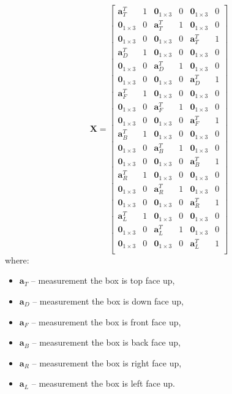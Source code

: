 \begin{equation}
	\bm{X} = 
	\begin{bmatrix}
		\bm{a}^T_T & 1 & \bm{0}_{1 \times 3} & 0 & \bm{0}_{1 \times 3} & 0\\
		\bm{0}_{1 \times 3} & 0 & \bm{a}^T_T & 1 & \bm{0}_{1 \times 3} & 0\\
		\bm{0}_{1 \times 3} & 0 & \bm{0}_{1 \times 3} & 0 & \bm{a}^T_T & 1\\
		
		\bm{a}^T_D & 1 & \bm{0}_{1 \times 3} & 0 & \bm{0}_{1 \times 3} & 0\\
		\bm{0}_{1 \times 3} & 0 & \bm{a}^T_D & 1 & \bm{0}_{1 \times 3} & 0\\
		\bm{0}_{1 \times 3} & 0 & \bm{0}_{1 \times 3} & 0 & \bm{a}^T_D & 1\\
		
		\bm{a}^T_F & 1 & \bm{0}_{1 \times 3} & 0 & \bm{0}_{1 \times 3} & 0\\
		\bm{0}_{1 \times 3} & 0 & \bm{a}^T_F & 1 & \bm{0}_{1 \times 3} & 0\\
		\bm{0}_{1 \times 3} & 0 & \bm{0}_{1 \times 3} & 0 & \bm{a}^T_F & 1\\
		
		\bm{a}^T_B & 1 & \bm{0}_{1 \times 3} & 0 & \bm{0}_{1 \times 3} & 0\\
		\bm{0}_{1 \times 3} & 0 & \bm{a}^T_B & 1 & \bm{0}_{1 \times 3} & 0\\
		\bm{0}_{1 \times 3} & 0 & \bm{0}_{1 \times 3} & 0 & \bm{a}^T_B & 1\\
		
		\bm{a}^T_R & 1 & \bm{0}_{1 \times 3} & 0 & \bm{0}_{1 \times 3} & 0\\
		\bm{0}_{1 \times 3} & 0 & \bm{a}^T_R & 1 & \bm{0}_{1 \times 3} & 0\\
		\bm{0}_{1 \times 3} & 0 & \bm{0}_{1 \times 3} & 0 & \bm{a}^T_R & 1\\
		
		\bm{a}^T_L & 1 & \bm{0}_{1 \times 3} & 0 & \bm{0}_{1 \times 3} & 0\\
		\bm{0}_{1 \times 3} & 0 & \bm{a}^T_L & 1 & \bm{0}_{1 \times 3} & 0\\
		\bm{0}_{1 \times 3} & 0 & \bm{0}_{1 \times 3} & 0 & \bm{a}^T_L & 1\\
	\end{bmatrix} 
	\label{ols_x}
\end{equation}
where:
\begin{itemize}
	\item $\bm{a}_T$ -- measurement the box is top face up,
	\item $\bm{a}_D$ -- measurement the box is down face up,
	\item $\bm{a}_F$ -- measurement the box is front face up,
	\item $\bm{a}_B$ -- measurement the box is back face up,
	\item $\bm{a}_R$ -- measurement the box is right face up,
	\item $\bm{a}_L$ -- measurement the box is left face up.
\end{itemize}

